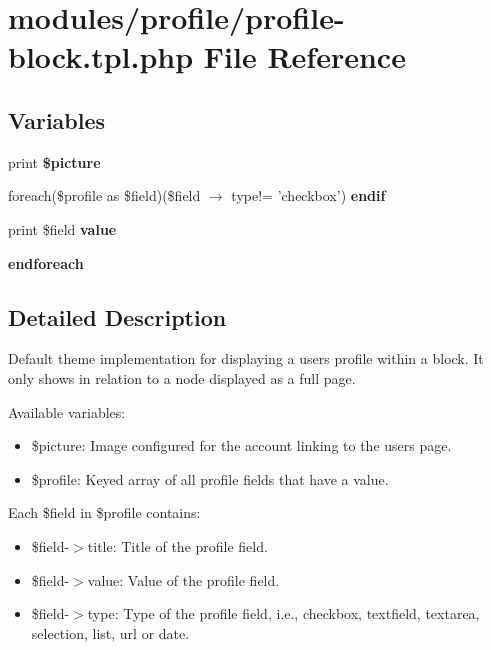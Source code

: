 \hypertarget{profile-block_8tpl_8php}{
\section{modules/profile/profile-block.tpl.php File Reference}
\label{profile-block_8tpl_8php}
}
\subsection*{Variables}
\begin{CompactItemize}
\item 
\hypertarget{profile-block_8tpl_8php_bb12f8c31dba99f68efccffe9434082c}{
print \textbf{\$picture}}
\label{profile-block_8tpl_8php_bb12f8c31dba99f68efccffe9434082c}

\item 
\hypertarget{profile-block_8tpl_8php_b10daa0a3e623adbea91445542c11cac}{
foreach(\$profile as \$field)(\$field $\rightarrow$ type!= 'checkbox') \textbf{endif}}
\label{profile-block_8tpl_8php_b10daa0a3e623adbea91445542c11cac}

\item 
\hypertarget{profile-block_8tpl_8php_0a58448988969e4dbe0aa7814b5a29fc}{
print \$field \textbf{value}}
\label{profile-block_8tpl_8php_0a58448988969e4dbe0aa7814b5a29fc}

\item 
\hypertarget{profile-block_8tpl_8php_672d9707ef91db026c210f98cc601123}{
\textbf{endforeach}}
\label{profile-block_8tpl_8php_672d9707ef91db026c210f98cc601123}

\end{CompactItemize}


\subsection{Detailed Description}
Default theme implementation for displaying a users profile within a block. It only shows in relation to a node displayed as a full page.

Available variables:\begin{itemize}
\item \$picture: Image configured for the account linking to the users page.\item \$profile: Keyed array of all profile fields that have a value.\end{itemize}


Each \$field in \$profile contains:\begin{itemize}
\item \$field-$>$title: Title of the profile field.\item \$field-$>$value: Value of the profile field.\item \$field-$>$type: Type of the profile field, i.e., checkbox, textfield, textarea, selection, list, url or date.\end{itemize}


